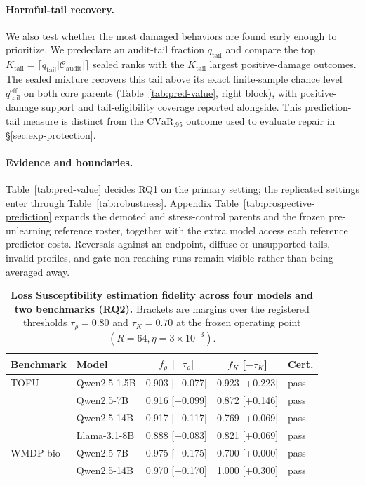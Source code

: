 \paragraph{Harmful-tail recovery.}
We also test whether the most damaged behaviors are found early enough to
prioritize. We predeclare an audit-tail fraction
$q_{\mathrm{tail}}$ and compare the top
$K_{\mathrm{tail}}=\lceil q_{\mathrm{tail}}
|\mathcal C_{\mathrm{audit}}|\rceil$ sealed ranks with the
$K_{\mathrm{tail}}$ largest positive-damage outcomes. The sealed mixture
recovers this tail above its exact finite-sample chance level
$q^{\mathrm{eff}}_{\mathrm{tail}}$ on both core parents
(Table~\ref{tab:pred-value}, right block), with positive-damage support and
tail-eligibility coverage reported alongside. This prediction-tail
measure is distinct from the $\mathrm{CVaR}_{.95}$ outcome used to evaluate
repair in \S\ref{sec:exp-protection}.

\paragraph{Evidence and boundaries.}
Table~\ref{tab:pred-value} decides RQ1 on the primary setting; the
replicated settings enter through Table~\ref{tab:robustness}. Appendix
Table~\ref{tab:prospective-prediction} expands the demoted and stress-control
parents and the frozen pre-unlearning reference roster, together with the
extra model access each reference predictor costs. Reversals against an endpoint,
diffuse or unsupported tails, invalid profiles, and gate-non-reaching runs
remain visible rather than being averaged away.

\begin{table}[t]
  \caption{\textbf{Loss Susceptibility estimation fidelity across four models
  and two benchmarks (RQ2).} Brackets are margins over the registered
  thresholds $\tau_\rho=0.80$ and $\tau_K=0.70$ at the frozen operating point
  $(R=64,\eta=3\!\times\!10^{-3})$.}
  \label{tab:loss-susceptibility-fidelity}
  \centering
  \small
  \setlength{\tabcolsep}{5pt}
  \begin{tabular}{@{}llccl@{}}
    \toprule
    Benchmark & Model & $f_\rho$ [$-\tau_\rho$] & $f_K$ [$-\tau_K$] & Cert. \\
    \midrule
TOFU     & Qwen2.5-1.5B  & 0.903 [+0.077] & 0.923 [+0.223] & pass \\
         & Qwen2.5-7B    & 0.916 [+0.099] & 0.872 [+0.146] & pass \\
         & Qwen2.5-14B   & 0.917 [+0.117] & 0.769 [+0.069] & pass \\
         & Llama-3.1-8B  & 0.888 [+0.083] & 0.821 [+0.069] & pass \\
\addlinespace[2pt]
WMDP-bio & Qwen2.5-7B    & 0.975 [+0.175] & 0.700 [+0.000] & pass \\
         & Qwen2.5-14B   & 0.970 [+0.170] & 1.000 [+0.300] & pass \\
    \bottomrule
  \end{tabular}
\end{table}

